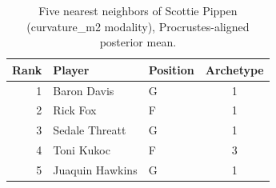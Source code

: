 \begin{table}[htbp]
  \centering\small
  \begin{tabular}{rllc}
    \toprule
    Rank & Player & Position & Archetype \\
    \midrule
    1 & Baron Davis & G & 1 \\
    2 & Rick Fox & F & 1 \\
    3 & Sedale Threatt & G & 1 \\
    4 & Toni Kukoc & F & 3 \\
    5 & Juaquin Hawkins & G & 1 \\
    \bottomrule
  \end{tabular}
  \caption{Five nearest neighbors of Scottie Pippen (curvature_m2 modality), Procrustes-aligned posterior mean.}
  \label{tab:Scottie_Pippen_neighbors_curvature_m2}
\end{table}

